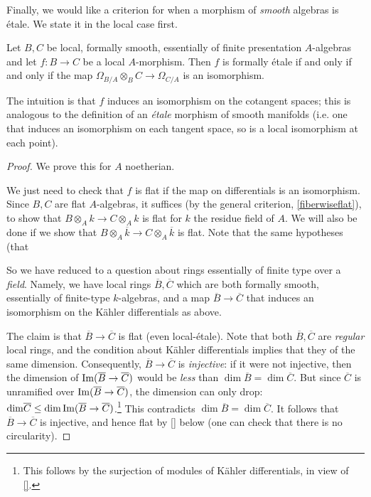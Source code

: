Finally, we would like a criterion for when a morphism of \emph{smooth}
algebras is \'etale.
We state it in the local case first.
\begin{proposition} \label{etalecotangent}
Let $B, C$ be local, formally smooth, essentially of finite presentation
$A$-algebras and let $f: B \to C$ be a local $A$-morphism.
Then $f$ is formally \'etale if and only if and only if the map $\Omega_{B/A}\otimes_B C \to \Omega_{C/A}$ is an isomorphism.
\end{proposition} 
The intuition is that $f$ induces an isomorphism on the cotangent spaces; this
is analogous to the definition of an \emph{\'etale} morphism of smooth
manifolds (i.e. one that induces an isomorphism on each tangent space, so is a
local isomorphism at each point).
\begin{proof} 
We prove this for $A$ noetherian. 

We just need to check that $f$ is flat if the map on differentials is an
isomorphism.
Since $B, C$ are flat $A$-algebras, it suffices (by the general criterion,
\cref{fiberwiseflat}), to show that $B
\otimes_A k \to C \otimes_A k$ is flat for $k$ the residue field of $A$. 
We will also be done if we show that $B \otimes_A \overline{k} \to C \otimes_A
\overline{k}$ is flat. Note that the same hypotheses (that 

So we have reduced to a question about rings essentially of finite type over a
\emph{field}. Namely, we have local rings $\overline{B}, \overline{C}$ which
are both formally smooth, essentially of finite-type $k$-algebras, and a map $\overline{B} \to \overline{C}$ that
induces an isomorphism on the K\"ahler differentials as above.

The claim is that $\overline{B} \to \overline{C}$ is flat (even local-\'etale). 
Note that both $\overline{B}, \overline{C}$ are \emph{regular} local rings, and
the condition about K\"ahler differentials implies that they of the same
dimension. Consequently, $\overline{B} \to \overline{C}$ is \emph{injective}:
if it were not injective, then the dimension of $\operatorname{Im}(\overline{B} \to
\overline{C})$ would be \emph{less} than $\dim \overline{B} = \dim \overline{C}$.
But since $\overline{C}$ is unramified over $\operatorname{Im}(\overline{B} \to
\overline{C})$, the dimension can only drop: $\mathrm{dim} \overline{C} \leq \mathrm{dim}
\operatorname{Im}(\overline{B} \to \overline{C})$.\footnote{This follows by the surjection of
modules of K\"ahler differentials, in view of \cref{}.}
This contradicts $\dim \overline{B} = \dim\overline{C}$. It follows that
$\overline{B} \to \overline{C}$ is injective, and hence flat by \cref{} below
(one can check that there is no circularity).


\end{proof} 

